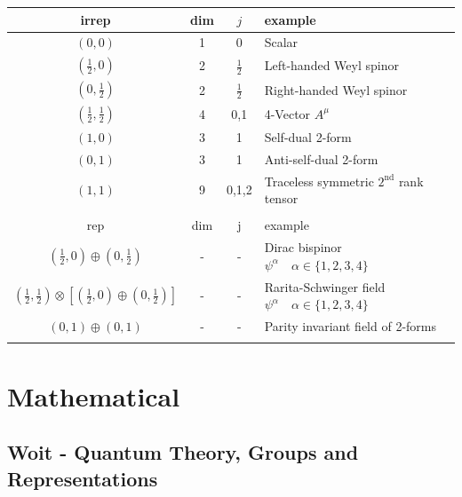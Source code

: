 \documentclass[10pt,a4paper]{article}
\theoremstyle{definition}
\begin{document}
\begin{center}
 \begin{tabular}{c c c l} 
 \hline
 irrep & dim & $j$ & example \\ [0.5ex] 
 \hline\hline
 $(0,0)$                        & 1 & 0 & Scalar \\  [0.5ex]
 $(\frac{1}{2},0)$              & 2 & $\frac{1}{2}$ & Left-handed Weyl spinor \\  [0.5ex]
 $(0,\frac{1}{2})$              & 2 & $\frac{1}{2}$ & Right-handed Weyl spinor \\  [0.5ex]
 $(\frac{1}{2},\frac{1}{2})$    & 4 & 0,1 & 4-Vector $A^\mu$ \\  [0.5ex]
 $(1,0)$                        & 3 & 1 & Self-dual 2-form \\  [0.5ex]
 $(0,1)$                        & 3 & 1 & Anti-self-dual 2-form \\  [0.5ex]
 $(1,1)$                        & 9 & 0,1,2 & Traceless symmetric $2^\text{nd}$ rank tensor \\ \hline  \\ [0.5ex]
  \hline
 rep & dim & j & example \\ [0.5ex] 
 \hline\hline
 $(\frac{1}{2},0)\oplus(0,\frac{1}{2})$& - & - & Dirac bispinor $\psi^\alpha\quad \alpha\in\{1,2,3,4\}$ \\  [0.5ex]
 $(\frac{1}{2},\frac{1}{2})\otimes\left[(\frac{1}{2},0)\oplus(0,\frac{1}{2})\right]$& - & - & Rarita-Schwinger field $\psi^\alpha\quad \alpha\in\{1,2,3,4\}$ \\  [0.5ex]
  $(0,1)\oplus(0,1)$& - & - & Parity invariant field of 2-forms\\ \hline \\ [0.5ex]
\end{tabular}
\end{center}



\newpage
\section{Mathematical}
\subsection{{\sc Woit} - Quantum Theory, Groups and Representations}
\end{document}
